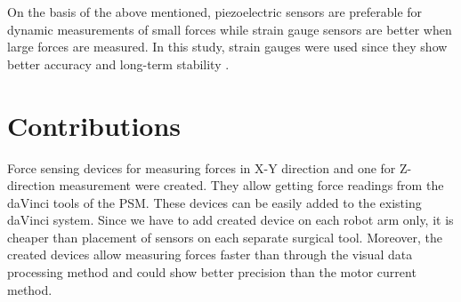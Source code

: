 On the basis of the above mentioned, piezoelectric sensors are preferable for dynamic measurements of small forces while strain gauge sensors are better when large forces are measured. In this study, strain gauges were used since they show better accuracy and long-term stability \cite{SGandP1,SGandP2}.

\section{Contributions}
\label{sec:MyAppr}
Force sensing devices for measuring forces in X-Y direction and one for Z-direction measurement were created. They allow getting force readings from the daVinci tools of the PSM.  These devices can be easily added to the existing daVinci system. Since we have to add created device on each robot arm only, it is cheaper than placement of sensors on each separate surgical tool.  Moreover, the created devices allow measuring forces faster than through the visual data processing method and could show better precision than the motor current method.
